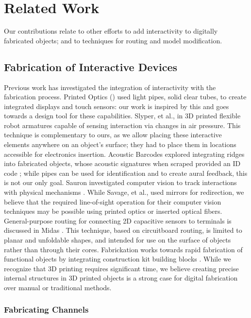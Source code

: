 \section{Related Work}
Our contributions relate to other efforts to add interactivity to digitally fabricated objects; and to techniques for routing and model modification.  

\subsection{Fabrication of Interactive Devices}

Previous work has investigated the integration of interactivity with the fabrication process.  Printed Optics (\cite{Willis-printedoptics}) used light pipes, solid clear tubes, to create integrated displays and touch sensors: our work is inspired by this and goes towards a design tool for these capabilities.  Slyper, et al., in \cite{Slyper-pressure} 3D printed flexible robot armatures capable of sensing interaction via changes in air pressure.  This technique is complementary to ours, as we allow placing these interactive elements anywhere on an object's surface; they had to place them in locations accessible for electronics insertion. Acoustic Barcodes explored integrating ridges into fabricated objects, whose acoustic signatures when scraped provided an ID code \cite{Harrison-acoustic}; while pipes can be used for identification and to create aural feedback, this is not our only goal.  Sauron investigated computer vision to track interactions with physical mechanisms \cite{Savage-sauron}.  While Savage, et al., used mirrors for redirection, we believe that the required line-of-sight operation for their computer vision techniques may be possible using printed optics or inserted optical fibers.  General-purpose routing for connecting 2D capacitive sensors to terminals is discussed in Midas \cite{Savage-midas}.  This technique, based on circuitboard routing, is limited to planar and unfoldable shapes, and intended for use on the surface of objects rather than through their cores.  Fabrickation works towards rapid fabrication of functional objects by integrating construction kit building blocks \cite{Mueller-fabrickation}.  While we recognize that 3D printing requires significant time, we believe creating precise internal structures in 3D printed objects is a strong case for digital fabrication over manual or traditional methods.

\subsubsection{Fabricating Channels}

